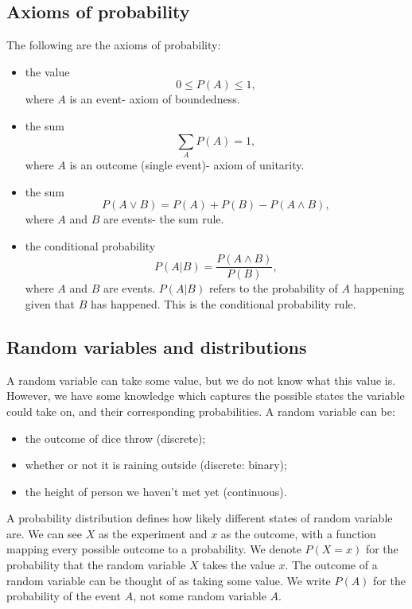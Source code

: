 \documentclass[a4paper, openany]{memoir}
\begin{document}
\subsection{Axioms of probability}
The following are the axioms of probability:
\begin{itemize}
    \item the value
    \[0 \leq P(A) \leq 1,\]
    where $A$ is an event- axiom of boundedness.
    
    \item the sum
    \[\sum_A P(A) = 1,\]
    where $A$ is an outcome (single event)- axiom of unitarity.

    \item the sum
    \[P(A \lor B) = P(A) + P(B) - P(A \land B),\]
    where $A$ and $B$ are events- the sum rule.

    \item the conditional probability
    \[P(A|B) = \frac{P(A \land B)}{P(B)},\]
    where $A$ and $B$ are events. $P(A|B)$ refers to the probability of $A$ happening given that $B$ has happened. This is the conditional probability rule.
\end{itemize}

\subsection{Random variables and distributions}
A random variable can take some value, but we do not know what this value is. However, we have some knowledge which captures the possible states the variable could take on, and their corresponding probabilities. A random variable can be:
\begin{itemize}
    \item the outcome of dice throw (discrete);
    \item whether or not it is raining outside (discrete: binary);
    \item the height of person we haven't met yet (continuous).
\end{itemize}

A probability distribution defines how likely different states of random variable are. We can see $X$ as the experiment and $x$ as the outcome, with a function mapping every possible outcome to a probability. We denote $P(X = x)$ for the probability that the random variable $X$ takes the value $x$. The outcome of a random variable can be thought of as taking some value. We write $P(A)$ for the probability of the event $A$, not some random variable $A$.
\end{document}
